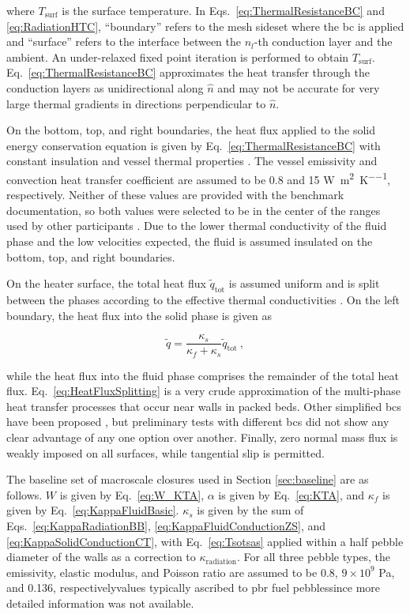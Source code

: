 \noindent where \(T_\text{surf}\) is the surface temperature. In Eqs.\ \eqref{eq:ThermalResistanceBC} and \eqref{eq:RadiationHTC}, ``boundary'' refers to the mesh sideset where the \gls{bc} is applied and ``surface'' refers to the interface between the \mbox{\(n_l\)-th} conduction layer and the ambient. An under-relaxed fixed point iteration is performed to obtain \(T_\text{surf}\). Eq.\ \eqref{eq:ThermalResistanceBC} approximates the heat transfer through the conduction layers as unidirectional along \(\hat{n}\) and may not be accurate for very large thermal gradients in directions perpendicular to \(\hat{n}\).

On the bottom, top, and right boundaries, the heat flux applied to the solid energy conservation equation is given by Eq.\ \eqref{eq:ThermalResistanceBC} with constant insulation and vessel thermal properties \cite{SANA}. The vessel emissivity and convection heat transfer coefficient are assumed to be 0.8 and 15 \si{\watt\per\square\meter\per\kelvin}, respectively. Neither of these values are provided with the benchmark documentation, so both values were selected to be in the center of the ranges used by other participants \cite{rousseau,baggemann,becker2003,lim,tecdoc1163}. Due to the lower thermal conductivity of the fluid phase and the low velocities expected, the fluid is assumed insulated on the bottom, top, and right boundaries.

On the heater surface, the total heat flux \(\tilde{q}_\text{tot}\) is assumed uniform and is split between the phases according to the effective thermal conductivities \cite{alazmi}. On the left boundary, the heat flux into the solid phase is given as

\begin{equation}
\label{eq:HeatFluxSplitting}
\tilde{q}=\frac{\kappa_s}{\kappa_f+\kappa_s} \tilde{q}_\text{tot}\ ,
\end{equation}

\noindent while the heat flux into the fluid phase comprises the remainder of the total heat flux. Eq.\ \eqref{eq:HeatFluxSplitting} is a very crude approximation of the multi-phase heat transfer processes that occur near walls in packed beds. Other simplified \glspl{bc} have been proposed \cite{alazmi}, but preliminary tests with different \glspl{bc} did not show any clear advantage of any one option over another. Finally, zero normal mass flux is weakly imposed on all surfaces, while tangential slip is permitted. 

The baseline set of macroscale closures used in Section \ref{sec:baseline} are as follows. \(W\) is given by Eq.\ \eqref{eq:W_KTA}, \(\alpha\) is given by Eq.\ \eqref{eq:KTA}, and \(\kappa_f\) is given by Eq.\ \eqref{eq:KappaFluidBasic}. \(\kappa_s\) is given by the sum of Eqs.\ \eqref{eq:KappaRadiationBB}, \eqref{eq:KappaFluidConductionZS}, and \eqref{eq:KappaSolidConductionCT}, with Eq.\ \eqref{eq:Tsotsas} applied within a half pebble diameter of the walls as a correction to \(\kappa_\text{radiation}\). For all three pebble types, the emissivity, elastic modulus, and Poisson ratio are assumed to be 0.8, \(9\times10^9\) Pa, and 0.136, respectively\mdash values typically ascribed to \gls{pbr} fuel pebbles\mdash since more detailed information was not available. 

